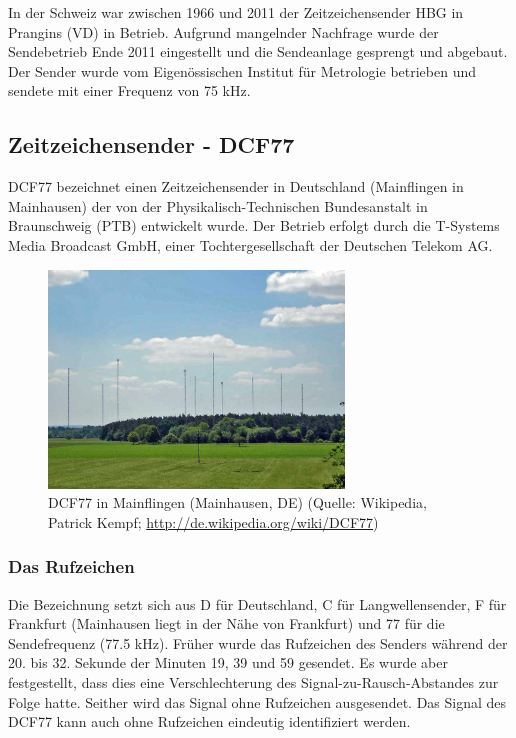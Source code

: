 In der Schweiz war zwischen 1966 und 2011 der Zeitzeichensender HBG in Prangins (VD) in Betrieb. Aufgrund mangelnder Nachfrage wurde der Sendebetrieb Ende 2011 eingestellt und die Sendeanlage gesprengt und abgebaut. Der Sender wurde vom Eigenössischen Institut für Metrologie betrieben und sendete mit einer Frequenz von 75 kHz.

\subsection{Zeitzeichensender - DCF77}
DCF77 bezeichnet einen Zeitzeichensender in Deutschland (Mainflingen in Mainhausen) der von der Physikalisch-Technischen Bundesanstalt in Braunschweig (PTB) entwickelt wurde. Der Betrieb erfolgt durch die T-Systems Media Broadcast GmbH, einer Tochtergesellschaft der Deutschen Telekom AG.

\begin{figure}
  \begin{center}
    \includegraphics[width=0.7\textwidth]{./images/Analyse/DCF77_Mainflingen.jpg}
  \end{center}
  \caption[DCF77 in Mainflingen (Mainhausen, DE)]{DCF77 in Mainflingen (Mainhausen, DE) (Quelle: Wikipedia, Patrick Kempf; \url{http://de.wikipedia.org/wiki/DCF77})} 
\end{figure}

\subsubsection{Das Rufzeichen}
Die Bezeichnung setzt sich aus D für Deutschland, C für Langwellensender, F für Frankfurt (Mainhausen liegt in der Nähe von Frankfurt) und 77 für die Sendefrequenz (77.5 kHz). Früher wurde das Rufzeichen des Senders während der 20. bis 32. Sekunde der Minuten 19, 39 und 59 gesendet. Es wurde aber festgestellt, dass dies eine Verschlechterung des Signal-zu-Rausch-Abstandes zur Folge hatte. Seither wird das Signal ohne Rufzeichen ausgesendet. Das Signal des DCF77 kann auch ohne Rufzeichen eindeutig identifiziert werden.

